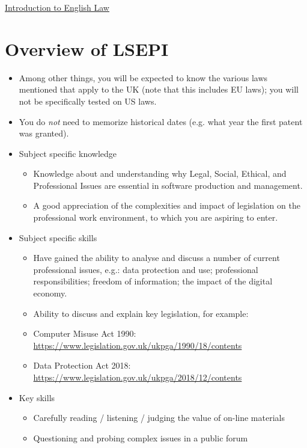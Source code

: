 \documentclass{article}
\begin{document}
\begin{center}
	\underline{\huge Introduction to English Law}
\end{center}	
	





\section{Overview of LSEPI}
\begin{itemize}
\item Among other things, you will be expected to know the various laws mentioned that apply to the UK (note that this includes EU laws); you will not be specifically tested on US laws.
\item You do \emph{not} need to memorize historical dates (e.g. what year the first patent was granted).
\end{itemize}

\begin{itemize}
\item Subject specific knowledge
\begin{itemize}
\item Knowledge about and understanding why Legal, Social, Ethical, and Professional Issues are essential in software production and management.
\item A good appreciation of the complexities and impact of legislation on the professional work environment, to which you are aspiring to enter. 
\end{itemize}
\item Subject specific skills
\begin{itemize}
\item Have gained the ability to analyse and discuss a number of current professional  issues, e.g.: data protection and use; professional responsibilities; freedom of information; the impact of the digital economy. 
\item Ability to discuss and explain key legislation, for example:
\item Computer Misuse Act 1990: \url{https://www.legislation.gov.uk/ukpga/1990/18/contents}
\item Data Protection Act 2018: \url{https://www.legislation.gov.uk/ukpga/2018/12/contents}
\end{itemize}
\end{itemize}

\begin{itemize}
\item Key skills
\begin{itemize}
\item Carefully reading / listening / judging the value of on-line materials
\item Questioning and probing complex issues in a public forum  
\end{itemize}
\end{itemize}
\end{document}
